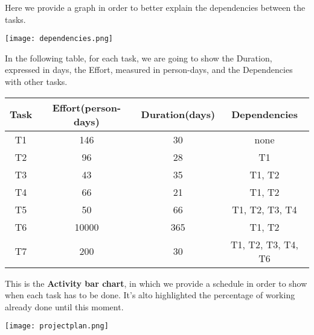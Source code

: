 \pagebreak
Here we provide a graph in order to better explain the dependencies between the tasks.
\begin{center}
	\texttt{[image: dependencies.png]}
\end{center}

In the following table, for each task, we are going to show the Duration, expressed in days, the Effort, measured in person-days, and the Dependencies with other tasks.
\begin{center}
	\begin{tabular}{c c c c}
		\hline
		\textbf{Task} & \textbf{Effort(person-days)} & \textbf{Duration(days)} & \textbf{Dependencies} \\
		\hline
		T1 & 146 & 30 & none \\
		T2 & 96 & 28 & T1 \\
		T3 & 43 & 35 & T1, T2 \\
		T4 & 66 & 21 & T1, T2 \\
		T5 & 50 & 66 & T1, T2, T3, T4 \\
		T6 & 10000 & 365 & T1, T2 \\
		T7 & 200 & 30 & T1, T2, T3, T4, T6  \\
		\hline
	\end{tabular}
\end{center}

This is the \textbf{Activity bar chart}, in which we provide a schedule in order to show when each task has to be done. It's alto highlighted the percentage of working already done until this moment.  
\begin{center}
	\texttt{[image: projectplan.png]}
\end{center}

